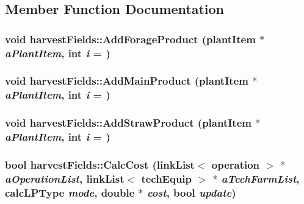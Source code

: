 \subsection{Member Function Documentation}
\hypertarget{classharvest_fields_a89f89e2f7d4efeb1905320514cd747b0}{
\subsubsection[{AddForageProduct}]{\setlength{\rightskip}{0pt plus 5cm}void harvestFields::AddForageProduct ({\bf plantItem} $\ast$ {\em aPlantItem}, \/  int {\em i} = {})}}
\label{classharvest_fields_a89f89e2f7d4efeb1905320514cd747b0}
\hypertarget{classharvest_fields_a815c019544bfb711da8dd32cc3be9974}{
\subsubsection[{AddMainProduct}]{\setlength{\rightskip}{0pt plus 5cm}void harvestFields::AddMainProduct ({\bf plantItem} $\ast$ {\em aPlantItem}, \/  int {\em i} = {})}}
\label{classharvest_fields_a815c019544bfb711da8dd32cc3be9974}
\hypertarget{classharvest_fields_a3928ce56a1f4783c76be19dca31a59ab}{
\subsubsection[{AddStrawProduct}]{\setlength{\rightskip}{0pt plus 5cm}void harvestFields::AddStrawProduct ({\bf plantItem} $\ast$ {\em aPlantItem}, \/  int {\em i} = {})}}
\label{classharvest_fields_a3928ce56a1f4783c76be19dca31a59ab}
\hypertarget{classharvest_fields_a9fcfd4121d8290708c8db3da63a56d78}{
\subsubsection[{CalcCost}]{\setlength{\rightskip}{0pt plus 5cm}bool harvestFields::CalcCost ({\bf linkList}$<$ {\bf operation} $>$ $\ast$ {\em aOperationList}, \/  {\bf linkList}$<$ {\bf techEquip} $>$ $\ast$ {\em aTechFarmList}, \/  {\bf calcLPType} {\em mode}, \/  double $\ast$ {\em cost}, \/  bool {\em update})}}
\label{classharvest_fields_a9fcfd4121d8290708c8db3da63a56d78}


